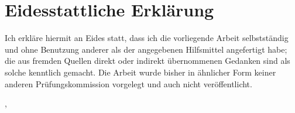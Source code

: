 \chapter{Eidesstattliche Erklärung}
\label{sec:declaration}
\thispagestyle{empty}

Ich erkläre hiermit an Eides statt, dass ich die vorliegende Arbeit selbstständig und ohne Benutzung anderer als der angegebenen Hilfsmittel angefertigt habe; die aus fremden Quellen direkt oder indirekt übernommenen Gedanken sind als solche kenntlich gemacht. Die Arbeit wurde bisher in ähnlicher Form keiner anderen Prüfungskommission vorgelegt und auch nicht veröffentlicht.

\bigskip
\bigskip
\bigskip
\bigskip

\begin{multicols}{2}
    \raggedright
    \thesisUniversityCity, \thesisDate

    \raggedleft
    \thesisAuthor
\end{multicols}
